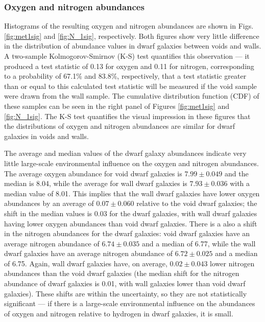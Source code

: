


\subsubsection{Oxygen and nitrogen abundances}\label{sec:OH_NH}

Histograms of the resulting oxygen and nitrogen abundances are shown in Figs. 
\ref{fig:met1sig} and \ref{fig:N_1sig}, respectively.  Both figures show very 
little difference in the distribution of abundance values in dwarf galaxies 
between voids and walls.  A two-sample Kolmogorov-Smirnov (K-S) test quantifies 
this observation --- it produced a test statistic of 0.13 for oxygen and 0.11 
for nitrogen, corresponding to a probability of 67.1\% and 83.8\%, respectively, 
that a test statistic greater than or equal to this calculated test statistic 
will be measured if the void sample were drawn from the wall sample.  The 
cumulative distribution function (CDF) of these samples can be seen in the right 
panel of Figures \ref{fig:met1sig} and \ref{fig:N_1sig}.  The K-S test 
quantifies the visual impression in these figures that the distributions of 
oxygen and nitrogen abundances are similar for dwarf galaxies in voids and 
walls.

The average and median values of the dwarf galaxy abundances indicate very 
little large-scale environmental influence on the oxygen and nitrogen 
abundances.  The average oxygen abundance for void dwarf galaxies is 
$7.99\pm 0.049$ and the median is 8.04, while the average for wall dwarf 
galaxies is $7.93\pm 0.036$ with a median value of 8.01.  This implies that the 
wall dwarf galaxies have lower oxygen abundances by an average of 
$0.07\pm 0.060$ relative to the void dwarf galaxies; the shift in the median 
values is 0.03 for the dwarf galaxies, with wall dwarf galaxies having lower 
oxygen abundances than void dwarf galaxies.  There is a also a shift in the 
nitrogen abundances for the dwarf galaxies: void dwarf galaxies have an average 
nitrogen abundance of $6.74\pm 0.035$ and a median of 6.77, while the wall dwarf 
galaxies have an average nitrogen abundance of $6.72\pm 0.025$ and a median of 
6.75.  Again, wall dwarf galaxies have, on average, $0.02\pm 0.043$ lower 
nitrogen abundances than the void dwarf galaxies (the median shift for the 
nitrogen abundance of dwarf galaxies is 0.01, with wall galaxies lower than void 
dwarf galaxies).  These shifts are within the uncertainty, so they are not 
statistically significant --- if there is a large-scale environmental influence 
on the abundances of oxygen and nitrogen relative to hydrogen in dwarf galaxies, 
it is small.

